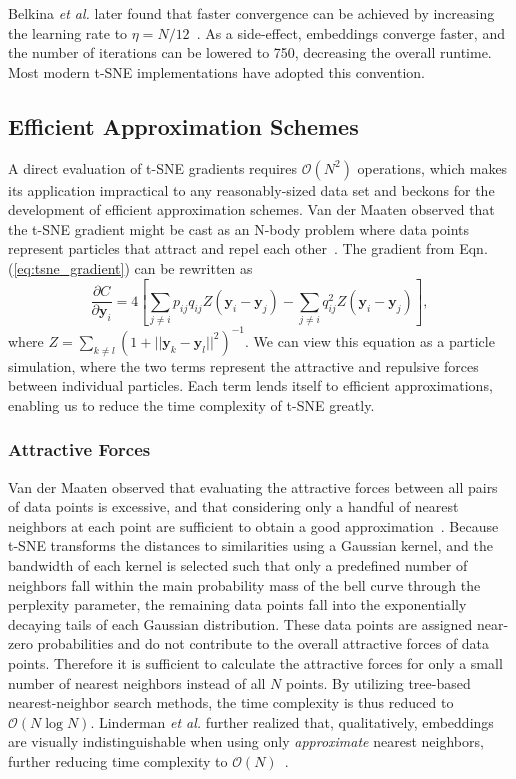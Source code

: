 \documentclass[letter]{article}
\begin{document}
Belkina \textit{et al.} later found that faster convergence can be achieved by increasing the learning rate to $\eta=N/12$~\cite{belkina2019automated}. As a side-effect, embeddings converge faster, and the number of iterations can be
lowered to 750, decreasing the overall runtime.  Most modern t-SNE implementations have adopted this convention.

\subsection*{Efficient Approximation Schemes} A direct evaluation of t-SNE gradients requires $\mathcal{O}(N^2)$ operations, which makes its application impractical to any reasonably-sized data set and beckons for the development of efficient approximation schemes. Van der Maaten observed that the t-SNE gradient might be cast as an N-body problem where data points represent particles that attract and repel each other~\cite{van2014accelerating}. The gradient from Eqn. (\ref{eq:tsne_gradient}) can be rewritten as
\begin{equation}
\frac{\partial C}{\partial \mathbf{y}_i} = 4 \left [ \sum_{j \neq i} p_{ij} q_{ij} Z \left ( \mathbf{y}_i - \mathbf{y}_j \right ) -\sum_{j \neq i} q_{ij}^2 Z \left ( \mathbf{y}_i - \mathbf{y}_j \right ) \right ], \label{eq:grad_attr_rep}
\end{equation}
where $Z = \sum_{k \neq l}\left ( 1 + || \mathbf{y}_k - \mathbf{y}_l ||^2 \right
)^{-1}$. We can view this equation as a particle simulation, where the
two terms represent the attractive and repulsive forces between individual
particles. Each term lends itself to efficient approximations, enabling us
to reduce the time complexity of t-SNE greatly.

\subsubsection*{Attractive Forces}

Van der Maaten observed that evaluating the attractive forces between all pairs
of data points is excessive, and that considering only a handful of nearest
neighbors at each point are sufficient to obtain a good
approximation~\cite{van2014accelerating}.  Because t-SNE transforms the distances to
similarities using a Gaussian kernel, and the bandwidth of each kernel is
selected such that only a predefined number of neighbors fall within the main
probability mass of the bell curve through the perplexity parameter, the
remaining data points fall into the exponentially decaying tails of each
Gaussian distribution.  These data points are assigned near-zero probabilities
and do not contribute to the overall attractive forces of data points.
Therefore it is sufficient to calculate the attractive forces for only a small
number of nearest neighbors instead of all $N$ points. By utilizing tree-based
nearest-neighbor search methods, the time complexity is thus reduced to
$\mathcal{O}(N \log N)$. Linderman \textit{et al.} further realized that,
qualitatively, embeddings are visually indistinguishable when using only
\textit{approximate} nearest neighbors, further reducing time complexity to
$\mathcal{O}(N)$~\cite{linderman2019fast}.
\end{document}
